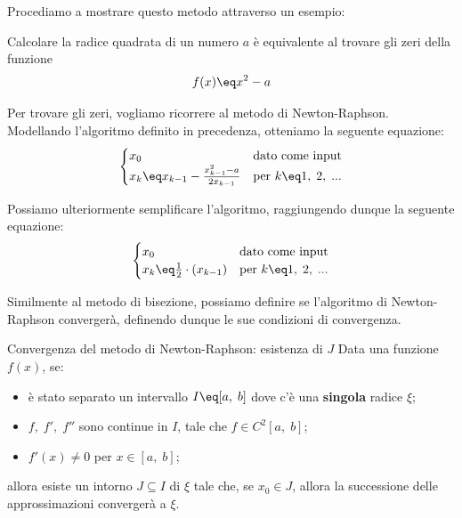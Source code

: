 \nwl
Procediamo a mostrare questo metodo attraverso un esempio:

\begin{example}
    Calcolare la radice quadrata di un numero $a$ è equivalente al trovare gli zeri della funzione
    \[ f(x) \eq x^2 - a \]

    Per trovare gli zeri, vogliamo ricorrere al metodo di Newton-Raphson. Modellando l'algoritmo definito in precedenza, otteniamo la seguente equazione:
    \[ \begin{cases}
        x_0 & \text{dato come input} \\
        x_k \eq x_{k - 1} - \frac{x^2_{k - 1} - a}{2x_{k - 1}} & \text{per } k \eq 1, \; 2, \; ...
    \end{cases} \]

    Possiamo ulteriormente semplificare l'algoritmo, raggiungendo dunque la seguente equazione:
    \[ \begin{cases}
        x_0 & \text{dato come input} \\
        x_k \eq \frac{1}{2} \cdot \left( x_{k - 1} \right) & \text{per } k \eq 1, \; 2, \; ...
    \end{cases} \]
\end{example}

Similmente al metodo di bisezione, possiamo definire se l'algoritmo di Newton-Raphson convergerà, definendo dunque le sue condizioni di convergenza.

\begin{theorem}{Convergenza del metodo di Newton-Raphson: esistenza di $J$}
    Data una funzione $f(x)$, se:
    \begin{itemize}
        \item è stato separato un intervallo $I \eq [a, \; b]$ dove c'è una \textbf{singola} radice $\xi$;
        \item $f, \; f', \; f''$ sono continue in $I$, tale che $f \in C^2 [a, \; b]$;
        \item $f'(x) \neq 0$ per $x \in [a, \; b]$;
    \end{itemize}

    allora esiste un intorno $J \subseteq I$ di $\xi$ tale che, se $x_0 \in J$, allora la successione delle approssimazioni convergerà a $\xi$.

    \begin{center}
    \end{center}
\end{theorem}

